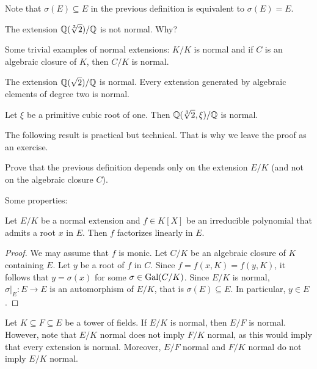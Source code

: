 Note that $\sigma(E)\subseteq E$ in the previous definition
is equivalent to $\sigma(E)=E$. 

\begin{example}
    The extension $\mathbb{Q}(\sqrt[3]{2})/\mathbb{Q}$ is not normal. Why?
\end{example}

Some trivial examples of normal extensions: $K/K$ is normal
and if $C$ is an algebraic closure of $K$, then $C/K$ is normal. 

\begin{example}
    The extension $\mathbb{Q}(\sqrt{2})/\mathbb{Q}$ is normal. 
    Every extension generated by algebraic elements of degree two is normal. 
\end{example}

\begin{exercise}
\label{xca:Q(sqrt[3]{2},xi) normal}
    Let $\xi$ be a primitive cubic root of one. Then 
    $\mathbb{Q}(\sqrt[3]{2},\xi)/\mathbb{Q}$ is normal. 
\end{exercise}

The following result is practical but technical. That is why we leave the proof
as an exercise. 

\begin{exercise}
    Prove that the previous definition depends only on the extension $E/K$ (and not on the
    algebraic closure $C$). 
\end{exercise}

Some properties:

\begin{proposition}
\label{pro:linear_factorization}
    Let $E/K$ be a normal extension and $f\in K[X]$ be an irreducible polynomial
    that admits a root $x$ in $E$. Then $f$ factorizes
    linearly in $E$.
\end{proposition}

\begin{proof}
    We may assume that $f$ is monic. Let $C/K$ be an algebraic closure of $K$ containing $E$. 
    Let $y$ be a root of $f$ in $C$. Since $f=f(x,K)=f(y,K)$, 
    it follows that $y=\sigma(x)$ for some $\sigma\in\operatorname{Gal}(C/K)$. Since 
    $E/K$ is normal, $\sigma|_E\colon E\to E$ is an automorphism of $E/K$, that is
    $\sigma(E)\subseteq E$. In particular, $y\in E$. 
\end{proof}

Let $K\subseteq F\subseteq E$ be a tower of fields. 
If $E/K$ is normal, then $E/F$ is normal. However, 
note that $E/K$ normal does not imply $F/K$ normal, as this would imply 
that every extension is normal. Moreover, 
$E/F$ normal and $F/K$ normal do not imply $E/K$ normal.
    
